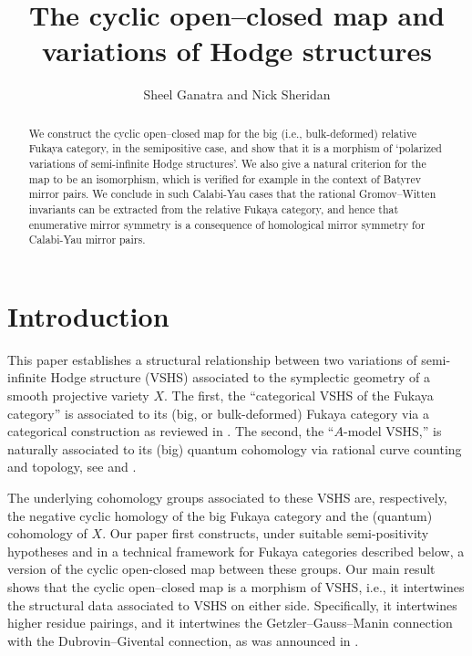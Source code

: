 \documentclass{article}
\title{The cyclic open--closed map and  variations of Hodge structures}
\author{Sheel Ganatra and Nick Sheridan}
\begin{document}
\maketitle

\begin{abstract}
    We construct the cyclic open--closed map for the big (i.e., bulk-deformed) relative Fukaya category, in the semipositive case, and show that it is a morphism of `polarized variations of semi-infinite Hodge structures'. 
    We also give a natural criterion for the map to be an isomorphism, which is verified for example in the context of Batyrev mirror pairs. We conclude in such Calabi-Yau cases that the rational Gromov--Witten invariants can be extracted from the relative Fukaya category, and hence that enumerative mirror symmetry is a consequence of homological mirror symmetry for Calabi-Yau mirror pairs.
\end{abstract}

\section{Introduction}

This paper establishes a structural relationship  between two variations of semi-infinite Hodge structure (VSHS) associated to the symplectic geometry of a smooth projective variety $X$. The first, the ``categorical VSHS of the Fukaya category'' is associated to its (big, or bulk-deformed) Fukaya category via a categorical construction as reviewed in \cite{Sheridan_formulae}. The second, the ``$A$-model VSHS,'' is naturally associated to its (big) quantum cohomology via rational curve counting and topology, see \cite{Barannikov} and \cite[Section 2.3.1]{CIT}. 

The underlying cohomology groups associated to these VSHS are, respectively, the negative cyclic homology of the big Fukaya category and the (quantum) cohomology of $X$. Our paper first constructs, under suitable semi-positivity hypotheses and in a technical framework for Fukaya categories described below, a version of the cyclic open-closed map \cite{Ganatra:cyclic} between these groups. Our main result shows that the cyclic open--closed map is a morphism of VSHS, i.e., it intertwines the structural data associated to VSHS on either side. Specifically, it intertwines higher residue pairings, and it intertwines the Getzler--Gauss--Manin connection with the Dubrovin--Givental connection, as was announced in \cite{Ganatra2015}.
\end{document}
